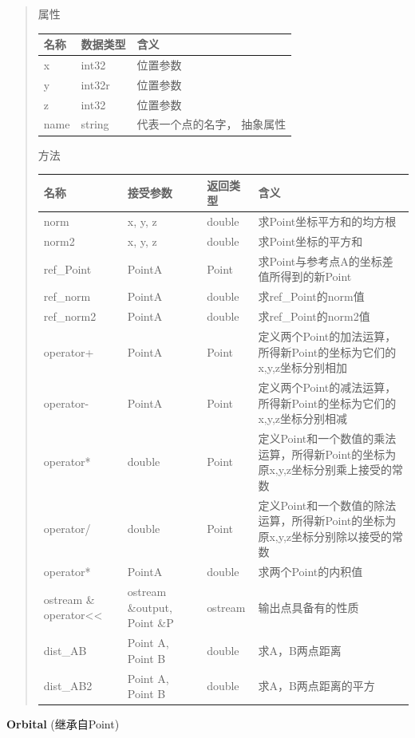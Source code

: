 \documentclass[11pt]{article}
\begin{document}
\begin{quote}
属性

\begin{longtable}[]{@{}lll@{}}
\toprule
名称 & 数据类型 & 含义\tabularnewline
\midrule
\endhead
x & int32 & 位置参数\tabularnewline
y & int32r & 位置参数\tabularnewline
z & int32 & 位置参数\tabularnewline
name & string & 代表一个点的名字， 抽象属性\tabularnewline
\bottomrule
\end{longtable}

方法

\begin{longtable}[]{@{}llll@{}}
\toprule
名称 & 接受参数 & 返回类型 & 含义\tabularnewline
\midrule
\endhead
norm & x, y, z & double & 求Point坐标平方和的均方根\tabularnewline
norm2 & x, y, z & double & 求Point坐标的平方和\tabularnewline
ref\_Point & PointA & Point &
求Point与参考点A的坐标差值所得到的新Point\tabularnewline
ref\_norm & PointA & double & 求ref\_Point的norm值\tabularnewline
ref\_norm2 & PointA & double & 求ref\_Point的norm2值\tabularnewline
operator+ & PointA & Point &
定义两个Point的加法运算，所得新Point的坐标为它们的x,y,z坐标分别相加\tabularnewline
operator- & PointA & Point &
定义两个Point的减法运算，所得新Point的坐标为它们的x,y,z坐标分别相减\tabularnewline
operator* & double & Point &
定义Point和一个数值的乘法运算，所得新Point的坐标为原x,y,z坐标分别乘上接受的常数\tabularnewline
operator/ & double & Point &
定义Point和一个数值的除法运算，所得新Point的坐标为原x,y,z坐标分别除以接受的常数\tabularnewline
operator* & PointA & double & 求两个Point的内积值\tabularnewline
ostream \& operator\textless{}\textless{} & ostream \&output, Point \&P
& ostream & 输出点具备有的性质\tabularnewline
dist\_AB & Point A, Point B & double & 求A，B两点距离\tabularnewline
dist\_AB2 & Point A, Point B & double &
求A，B两点距离的平方\tabularnewline
\bottomrule
\end{longtable}
\end{quote}

\textbf{Orbital} (继承自Point)
\end{document}

